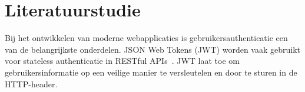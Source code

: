 








\section{Literatuurstudie}%
\label{sec:literatuurstudie}


Bij het ontwikkelen van moderne webapplicaties is gebruikersauthenticatie een van de belangrijkste onderdelen. JSON Web Tokens (JWT) worden vaak gebruikt voor stateless authenticatie in RESTful APIs~\autocite{Jones2015}. JWT laat toe om gebruikersinformatie op een veilige manier te versleutelen en door te sturen in de HTTP-header.

